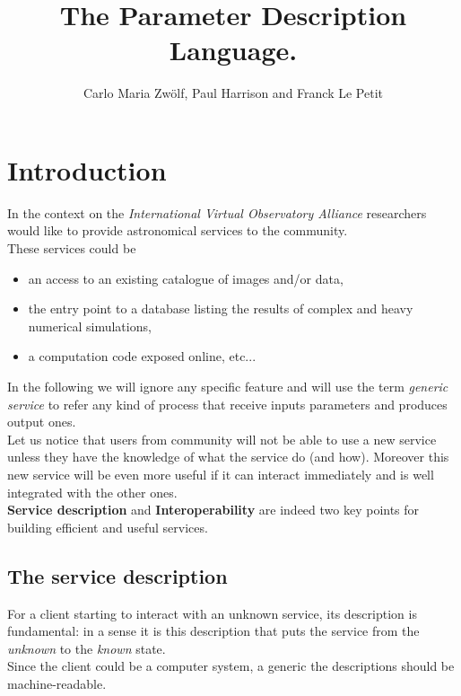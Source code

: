\documentclass[a4paper,11pt] {article}
\title{The Parameter Description Language. }
\author{Carlo Maria Zw\"olf, Paul Harrison and Franck Le Petit}
\begin{document}
\maketitle

\tableofcontents

\newpage

\section{Introduction}

In the context on the {\it International Virtual Observatory Alliance} researchers would like to provide astronomical services to the community. \\
These services could be
\begin{itemize}
\item  an access to an existing catalogue of images and/or data,
\item  the entry point to a database listing the results of complex  and heavy numerical simulations,
\item a computation code exposed online, etc... 
\end{itemize}
In the following we will ignore any specific feature and will use the term {\it generic service} to refer any kind of process that receive inputs parameters and produces output ones.\\

Let us notice that users from community will not be able to use a new service unless they have the knowledge of what the service do (and how). 
Moreover this new service will be even more useful if it can interact immediately and is well integrated with the other ones.\\

{\bf Service description} and {\bf Interoperability} are indeed two key points for building efficient and useful services.

\subsection{The service description}
For a client starting to interact with an unknown service, its description is fundamental: in a sense it is this description that puts the service from the {\it unknown} to the {\it known} state.\\
Since the client could be a computer system, a generic the descriptions should be machine-readable.\\
\end{document}
